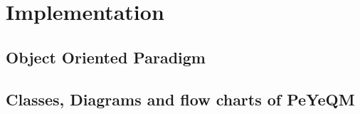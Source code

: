 \chapter{Implementation}
\label{ch:Implementation}

\section{Object Oriented Paradigm}
\section{Classes, Diagrams and flow charts of PeYeQM}
